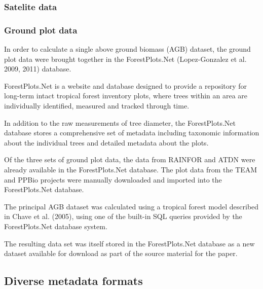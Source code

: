 \documentclass{article}
\begin{document}
\subsubsection{Satelite data}






\subsubsection{Ground plot data}

In order to calculate a single above ground biomass (AGB) dataset,
the ground plot data were brought together in the ForestPlots.Net
(Lopez-Gonzalez et al. 2009, 2011)
database.

ForestPlots.Net is a website and database designed to provide a repository for
long-term intact tropical forest inventory plots, where trees within an area are
individually identified, measured and tracked through time.

In addition to the raw measurements of tree diameter, the ForestPlots.Net database
stores a comprehensive set of metadata including taxonomic information about
the individual trees and detailed metadata about the plots.

Of the three sets of ground plot data, the data from RAINFOR and ATDN were
already available in the ForestPlots.Net database. The plot data from the TEAM
and PPBio projects were manually downloaded and imported into the
ForestPlots.Net database.

The principal AGB dataset was calculated using a tropical forest model described in Chave et al. (2005),
using one of the built-in SQL queries provided by the ForestPlots.Net database
system.

The resulting data set was itself stored in the ForestPlots.Net database as
a new dataset available for download as part of the source material for the paper.






\subsection{Diverse metadata formats}
\end{document}
